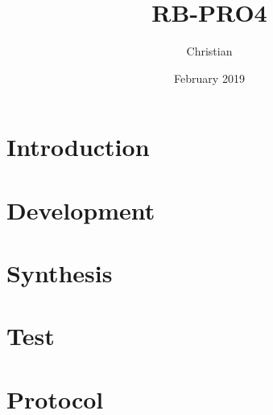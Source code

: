 \documentclass{report}
\title{RB-PRO4}
\author{Christian}
\date{February 2019}
\begin{document}

\maketitle

\begin{abstract}

\end{abstract}

\tableofcontents

\newpage
{}

\chapter{Introduction}


\chapter{Development}


\chapter{Synthesis}


\chapter{Test}


\chapter{Protocol}


\newpage
\printbibliography
\end{document}
